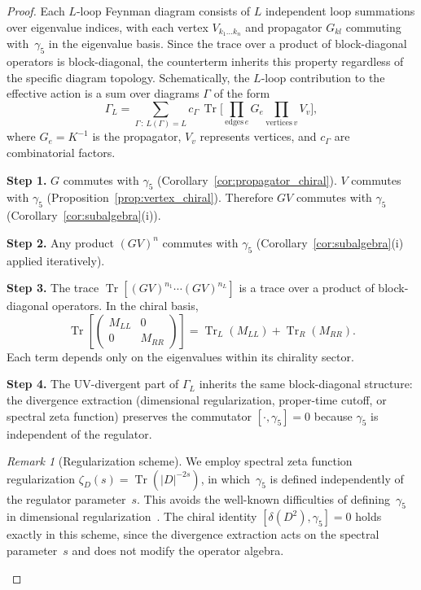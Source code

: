 \documentclass[12pt,a4paper]{article}
\theoremstyle{definition}
\theoremstyle{remark}
\newtheorem{remark}[theorem]{Remark}
\newcommand{\Tr}{\operatorname{Tr}}
\begin{document}
\begin{proof}
Each $L$-loop Feynman diagram consists of $L$ independent loop summations
over eigenvalue indices, with each vertex $V_{k_1 \ldots k_n}$ and propagator
$G_{kl}$ commuting with~$\gamma_5$ in the eigenvalue basis.  Since the trace
over a product of block-diagonal operators is block-diagonal, the counterterm
inherits this property regardless of the specific diagram topology.
Schematically, the $L$-loop contribution to the effective action is a sum over
diagrams $\Gamma$ of the form
\begin{equation}\label{eq:L_loop}
  \Gamma_L = \sum_{\Gamma\,:\,L(\Gamma)=L}
  c_\Gamma\,\Tr\!\bigl[\prod_{\text{edges}\,e} G_e
  \prod_{\text{vertices}\,v} V_v\bigr],
\end{equation}
where $G_e = K^{-1}$ is the propagator, $V_v$ represents vertices, and
$c_\Gamma$ are combinatorial factors.

\medskip\noindent\textbf{Step 1.}
$G$ commutes with $\gamma_5$ (Corollary~\ref{cor:propagator_chiral}).
$V$ commutes with $\gamma_5$ (Proposition~\ref{prop:vertex_chiral}).
Therefore $GV$ commutes with $\gamma_5$
(Corollary~\ref{cor:subalgebra}(i)).

\medskip\noindent\textbf{Step 2.}
Any product $(GV)^n$ commutes with $\gamma_5$
(Corollary~\ref{cor:subalgebra}(i) applied iteratively).

\medskip\noindent\textbf{Step 3.}
The trace $\Tr[(GV)^{n_1}\cdots(GV)^{n_L}]$ is a trace over a product
of block-diagonal operators.  In the chiral basis,
\begin{equation}\label{eq:block_trace}
  \Tr\!\left[\begin{pmatrix} M_{LL} & 0 \\ 0 & M_{RR}\end{pmatrix}\right]
  = \Tr_L(M_{LL}) + \Tr_R(M_{RR}).
\end{equation}
Each term depends only on the eigenvalues within its chirality sector.

\medskip\noindent\textbf{Step 4.}
The UV-divergent part of $\Gamma_L$ inherits the same block-diagonal
structure: the divergence extraction (dimensional regularization, proper-time
cutoff, or spectral zeta function) preserves the commutator
$[\cdot, \gamma_5] = 0$ because $\gamma_5$ is independent of the regulator.

\begin{remark}[Regularization scheme]\label{rem:regularization}
We employ spectral zeta function regularization
$\zeta_D(s) = \Tr(|D|^{-2s})$, in which~$\gamma_5$ is defined independently
of the regulator parameter~$s$.  This avoids the well-known difficulties of
defining~$\gamma_5$ in dimensional
regularization~\cite{Jegerlehner:2000dz}.  The chiral identity
$[\delta(D^2), \gamma_5] = 0$ holds exactly in this scheme, since the
divergence extraction acts on the spectral parameter~$s$ and does not modify
the operator algebra.
\end{remark}


\end{proof}
\end{document}
